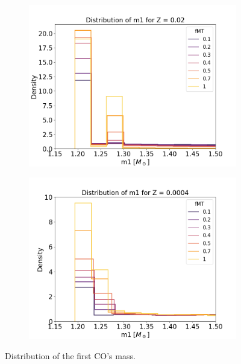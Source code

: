 \documentclass[preprint,12pt]{elsarticle}
\begin{document}
\begin{figure}[ht]
    \centering
    \begin{subfigure}[t]{0.45\textwidth}
        \centering
        \includegraphics[width=1\textwidth]{Images/m1_zoom.png}
    \end{subfigure}
    \begin{subfigure}[t]{0.45\textwidth}
    \centering
        \includegraphics[width=1\textwidth]{Images/m1_zoomZ0.0004.png}
    \end{subfigure}
    \caption{Distribution of the first CO's mass.}
    \label{img:m1_zoom}
\end{figure}
    
\end{document}
